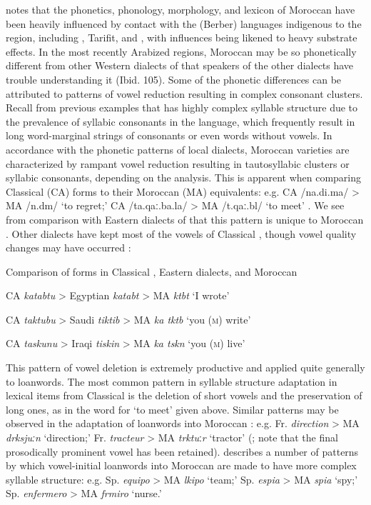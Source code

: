  \citet{Chtatou1997} notes that the phonetics, phonology, morphology, and lexicon of Moroccan  have been heavily influenced by contact with the  (Berber) languages indigenous to the region, including , Tarifit, and , with influences being likened to heavy substrate effects. In the most recently Arabized regions, Moroccan  may be so phonetically different from other Western dialects of  that speakers of the other dialects have trouble understanding it (Ibid. 105). Some of the phonetic differences can be attributed to patterns of vowel reduction resulting in complex consonant clusters. Recall from previous examples that  has highly complex syllable structure due to the prevalence of syllabic consonants in the language, which frequently result in long word-marginal strings of consonants or even words without vowels. In accordance with the phonetic patterns of local  dialects, Moroccan  varieties are characterized by rampant vowel reduction resulting in tautosyllabic clusters or syllabic consonants, depending on the analysis. This is apparent when comparing Classical  (CA) forms to their Moroccan  (MA) equivalents: e.g. CA /na.di.ma/ > MA /n.dm/ ‘to regret;’ CA /ta.qaː.ba.la/ > MA /t.qaː.bl/ ‘to meet’ \citep[110]{Chtatou1997}. We see from comparison with Eastern dialects of  that this pattern is unique to Moroccan . Other dialects have kept most of the vowels of Classical , though vowel quality changes may have occurred :

\ea\label{ex:8.5}
  Comparison of forms in Classical , Eastern dialects, and Moroccan 

  CA \textit{katabtu} > Egyptian  \textit{katabt} > MA \textit{ktbt} ‘I wrote’ 

  CA \textit{taktubu} > Saudi  \textit{tiktib} > MA \textit{ka tktb} ‘you (\textsc{m}) write’

  CA \textit{taskunu} > Iraqi  \textit{tiskin} > MA \textit{ka tskn} ‘you (\textsc{m}) live’
\citep[111--112]{Chtatou1997}
\z

This pattern of vowel deletion is extremely productive and applied quite generally to loanwords. The most common pattern in syllable structure adaptation in lexical items from Classical  is the deletion of short vowels and the preservation of long ones, as in the word for ‘to meet’ given above. Similar patterns may be observed in the adaptation of  loanwords into Moroccan : e.g. Fr. \textit{direction} > MA \textit{drksjuːn} ‘direction;’ Fr. \textit{tracteur} > MA \textit{trktu}ː\textit{r} ‘tractor’ (\citealt[116]{Chtatou1997}; note that the final prosodically prominent vowel has been retained). \citet{Sayahi2005} describes a number of patterns by which vowel-initial  loanwords into Moroccan  are made to have more complex syllable structure: e.g. Sp. \textit{equipo} > MA \textit{lkipo} ‘team;’ Sp. \textit{espia} > MA \textit{spia} ‘spy;’ Sp. \textit{enfermero} > MA \textit{frmiro} ‘nurse.’

